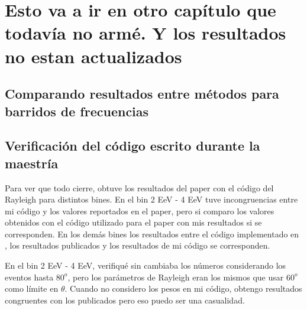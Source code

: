 
\chapter{Esto va a ir en otro capítulo que todavía no armé. Y los resultados no estan actualizados}
\section{Comparando resultados entre métodos para barridos de frecuencias}

\section{Verificación del código escrito durante la maestría}

Para ver que todo cierre, obtuve los resultados del paper \cite{Aab_2020} con el código del Rayleigh para distintos bines. En el bin  2 EeV - 4 EeV  tuve incongruencias entre mi código y los valores reportados en el paper, pero si comparo los valores obtenidos con el código utilizado para el paper con mis resultados si se corresponden. En los demás bines los resultados entre el código implementado en \cite{Aab_2020}, los resultados publicados y los resultados de mi código se corresponden.


En el bin 2 EeV - 4 EeV, verifiqué sin cambiaba los números considerando los eventos hasta $80^o$, pero los parámetros de Rayleigh eran los mismos que usar $60^o$  como límite en $\theta$.  Cuando no considero los pesos en mi código, obtengo resultados congruentes con los publicados pero eso puedo ser una casualidad.

